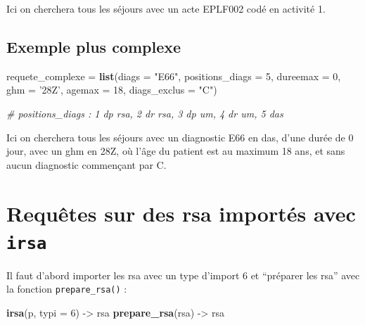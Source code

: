 \documentclass[]{book}
\newenvironment{Shaded}{\begin{snugshade}}{\end{snugshade}}
\newcommand{\CommentTok}[1]{\textcolor[rgb]{0.56,0.35,0.01}{\textit{#1}}}
\newcommand{\DataTypeTok}[1]{\textcolor[rgb]{0.13,0.29,0.53}{#1}}
\newcommand{\DecValTok}[1]{\textcolor[rgb]{0.00,0.00,0.81}{#1}}
\newcommand{\KeywordTok}[1]{\textcolor[rgb]{0.13,0.29,0.53}{\textbf{#1}}}
\newcommand{\NormalTok}[1]{#1}
\newcommand{\StringTok}[1]{\textcolor[rgb]{0.31,0.60,0.02}{#1}}
\begin{document}
Ici on cherchera tous les séjours avec un acte EPLF002 codé en activité 1.

\hypertarget{exemple-plus-complexe}{%
\subsection{Exemple plus complexe}\label{exemple-plus-complexe}}

\begin{Shaded}
\begin{Highlighting}[]
\NormalTok{requete_complexe =}\StringTok{ }\KeywordTok{list}\NormalTok{(}\DataTypeTok{diags =} \StringTok{"E66"}\NormalTok{, }
                        \DataTypeTok{positions_diags =} \DecValTok{5}\NormalTok{, }
                        \DataTypeTok{dureemax =} \DecValTok{0}\NormalTok{,}
                        \DataTypeTok{ghm =} \StringTok{'28Z'}\NormalTok{,}
                        \DataTypeTok{agemax =} \DecValTok{18}\NormalTok{,}
                        \DataTypeTok{diags_exclus =} \StringTok{"C"}\NormalTok{)}

\CommentTok{# positions_diags : 1 dp rsa, 2 dr rsa, 3 dp um, 4 dr um, 5 das}
\end{Highlighting}
\end{Shaded}

Ici on cherchera tous les séjours avec un diagnostic E66 en das, d'une durée de 0 jour, avec un ghm en 28Z, où l'âge du patient est au maximum 18 ans, et sans aucun diagnostic commençant par C.

\hypertarget{requetes-sur-des-rsa-importes-avec-irsa}{%
\section{\texorpdfstring{Requêtes sur des rsa importés avec \texttt{irsa}}{Requêtes sur des rsa importés avec irsa}}\label{requetes-sur-des-rsa-importes-avec-irsa}}

Il faut d'abord importer les rsa avec un type d'import 6 et ``préparer les rsa'' avec la fonction \texttt{prepare\_rsa()} :

\begin{Shaded}
\begin{Highlighting}[]
\KeywordTok{irsa}\NormalTok{(p, }\DataTypeTok{typi =} \DecValTok{6}\NormalTok{) ->}\StringTok{ }\NormalTok{rsa}
\KeywordTok{prepare_rsa}\NormalTok{(rsa) ->}\StringTok{ }\NormalTok{rsa}
\end{Highlighting}
\end{Shaded}
\end{document}
